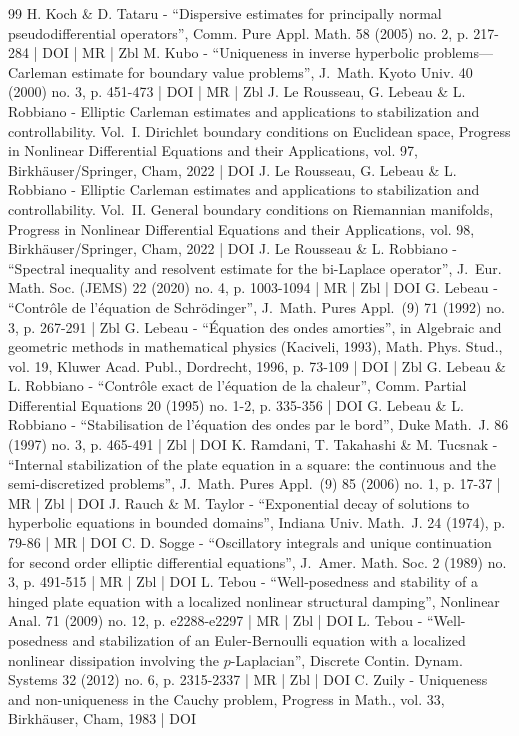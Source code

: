 \documentclass[10pt]{amsart}
\theoremstyle{plain}
\theoremstyle{definition}
\begin{document}
\begin{thebibliography}{99}
H. Koch \& D. Tataru - “Dispersive estimates for principally normal pseudodifferential operators”, Comm. Pure Appl. Math. 58 (2005) no. 2, p. 217-284 | DOI | MR | Zbl
M. Kubo - “Uniqueness in inverse hyperbolic problems—Carleman estimate for boundary value problems”, J. Math. Kyoto Univ. 40 (2000) no. 3, p. 451-473 | DOI | MR | Zbl
J. Le Rousseau, G. Lebeau \& L. Robbiano - Elliptic Carleman estimates and applications to stabilization and controllability. Vol. I. Dirichlet boundary conditions on Euclidean space, Progress in Nonlinear Differential Equations and their Applications, vol. 97, Birkhäuser/Springer, Cham, 2022 | DOI
J. Le Rousseau, G. Lebeau \& L. Robbiano - Elliptic Carleman estimates and applications to stabilization and controllability. Vol. II. General boundary conditions on Riemannian manifolds, Progress in Nonlinear Differential Equations and their Applications, vol. 98, Birkhäuser/Springer, Cham, 2022 | DOI
J. Le Rousseau \& L. Robbiano - “Spectral inequality and resolvent estimate for the bi-Laplace operator”, J. Eur. Math. Soc. (JEMS) 22 (2020) no. 4, p. 1003-1094 | MR | Zbl | DOI
G. Lebeau - “Contrôle de l’équation de Schrödinger”, J. Math. Pures Appl. (9) 71 (1992) no. 3, p. 267-291 | Zbl
G. Lebeau - “Équation des ondes amorties”, in Algebraic and geometric methods in mathematical physics (Kaciveli, 1993), Math. Phys. Stud., vol. 19, Kluwer Acad. Publ., Dordrecht, 1996, p. 73-109 | DOI | Zbl
G. Lebeau \& L. Robbiano - “Contrôle exact de l’équation de la chaleur”, Comm. Partial Differential Equations 20 (1995) no. 1-2, p. 335-356 | DOI
G. Lebeau \& L. Robbiano - “Stabilisation de l’équation des ondes par le bord”, Duke Math. J. 86 (1997) no. 3, p. 465-491 | Zbl | DOI
K. Ramdani, T. Takahashi \& M. Tucsnak - “Internal stabilization of the plate equation in a square: the continuous and the semi-discretized problems”, J. Math. Pures Appl. (9) 85 (2006) no. 1, p. 17-37 | MR | Zbl | DOI
J. Rauch \& M. Taylor - “Exponential decay of solutions to hyperbolic equations in bounded domains”, Indiana Univ. Math. J. 24 (1974), p. 79-86 | MR | DOI
C. D. Sogge - “Oscillatory integrals and unique continuation for second order elliptic differential equations”, J. Amer. Math. Soc. 2 (1989) no. 3, p. 491-515 | MR | Zbl | DOI
L. Tebou - “Well-posedness and stability of a hinged plate equation with a localized nonlinear structural damping”, Nonlinear Anal. 71 (2009) no. 12, p. e2288-e2297 | MR | Zbl | DOI
L. Tebou - “Well-posedness and stabilization of an Euler-Bernoulli equation with a localized nonlinear dissipation involving the $p$-Laplacian”, Discrete Contin. Dynam. Systems 32 (2012) no. 6, p. 2315-2337 | MR | Zbl | DOI
C. Zuily - Uniqueness and non-uniqueness in the Cauchy problem, Progress in Math., vol. 33, Birkhäuser, Cham, 1983 | DOI
\end{thebibliography}
\end{document}
